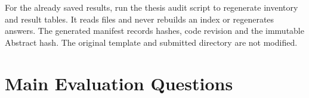 For the already saved results, run the thesis audit script to regenerate inventory and result tables. It reads files and never rebuilds an index or regenerates answers. The generated manifest records hashes, code revision and the immutable Abstract hash. The original template and submitted directory are not modified.

\section{Main Evaluation Questions}

